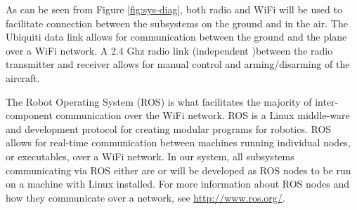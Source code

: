 \documentclass[]{auvsi_doc}
\begin{document}
As can be seen from Figure \ref{fig:sys-diag}, both radio and WiFi will be used to facilitate connection between the subsystems on the ground and in the air. The Ubiquiti data link allows for communication between the ground and the plane over a WiFi network. A 2.4 Ghz radio link (independent )between the radio transmitter and receiver allows for manual control and arming/disarming of the aircraft.

The Robot Operating System (ROS) is what facilitates the majority of inter-component communication over the WiFi network. ROS is a Linux middle-ware and development protocol for creating modular programs for robotics. ROS allows for real-time communication between machines running individual nodes, or executables, over a WiFi network. In our system, all subsystems communicating via ROS either are or will be developed as ROS nodes to be run on a machine with Linux installed. For more information about ROS nodes and how they communicate over a network, see \url{http://www.ros.org/}.
\end{document}
